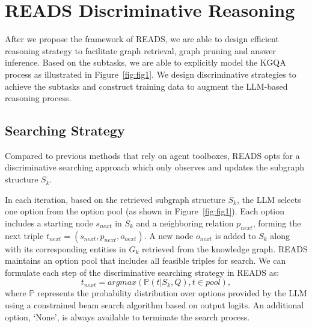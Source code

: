 \documentclass[11pt]{article}
\begin{document}
\section{READS Discriminative Reasoning}
\label{sec:approch}
After we propose the framework of READS, we are able to design efficient reasoning strategy to facilitate graph retrieval, graph pruning and answer inference. 
Based on the subtasks, we are able to explicitly model the KGQA process as illustrated in Figure~\ref{fig:fig1}. We design discriminative strategies to achieve the subtasks and construct training data to augment the LLM-based reasoning process.


\subsection{Searching Strategy}

Compared to previous methods that rely on agent toolboxes, READS opts for a discriminative searching approach which only observes and updates the subgraph structure $S_k$. 

In each iteration, based on the retrieved subgraph structure $S_k$, the LLM selects one option from the option pool (as shown in Figure~\ref{fig:fig1}). Each option includes a starting node $s_{next}$ in $S_k$ and a neighboring relation $p_{next}$, forming the next triple $t_{next}=(s_{next},p_{next},o_{next})$. A new node $o_{next}$ is added to $S_k$ along with its corresponding entities in $G_k$ retrieved from the knowledge graph. READS maintains an option pool that includes all feasible triples for search. We can formulate each step of the discriminative searching strategy in READS as:
\begin{equation}
    t_{next}=argmax(\mathbb{P}(t|S_{k},Q),t\in pool),
\end{equation}
where $\mathbb{P}$ represents the probability distribution over options provided by the LLM using a constrained beam search algorithm based on output logits. An additional option, `None', is always available to terminate the search process.
\end{document}
